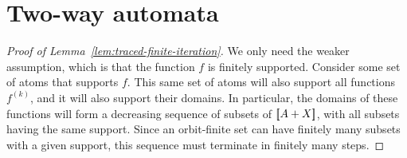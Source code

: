 \section{Two-way automata}  


\begin{proof}[Proof of Lemma~\ref{lem:traced-finite-iteration}]
    We only need the weaker assumption, which is that the function $f$ is finitely supported. Consider some set of atoms that supports $f$. This same set of atoms will also support all functions $f^{(k)}$, and it will also support their domains. In particular, the domains of these functions will form a decreasing sequence of subsets of $[{\kern-0.45ex}[A + X]{\kern-0.45ex}]$, with all subsets having the same support. Since an orbit-finite set can have finitely many subsets with a given support, this sequence must terminate in finitely many steps.
\end{proof} 

